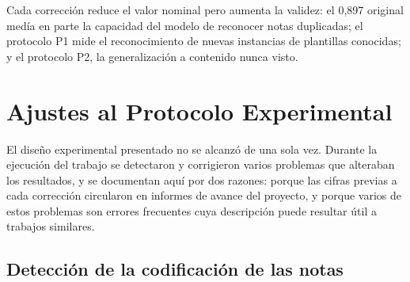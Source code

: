 \begin{table}[ht]
\centering
\caption{Evolución de los resultados del Experimento 3 al corregir el protocolo de evaluación}
\label{tab:escalera}
\end{table}

Cada corrección reduce el valor nominal pero aumenta la validez: el 0,897 original medía en parte la capacidad del modelo de reconocer notas duplicadas; el protocolo P1 mide el reconocimiento de nuevas instancias de plantillas conocidas; y el protocolo P2, la generalización a contenido nunca visto.




\section{Ajustes al Protocolo Experimental}
\label{sec:ajustes_protocolo}

El diseño experimental presentado no se alcanzó de una sola vez. Durante la ejecución del trabajo se detectaron y corrigieron varios problemas que alteraban los resultados, y se documentan aquí por dos razones: porque las cifras previas a cada corrección circularon en informes de avance del proyecto, y porque varios de estos problemas son errores frecuentes cuya descripción puede resultar útil a trabajos similares.

\subsection{Detección de la codificación de las notas}

